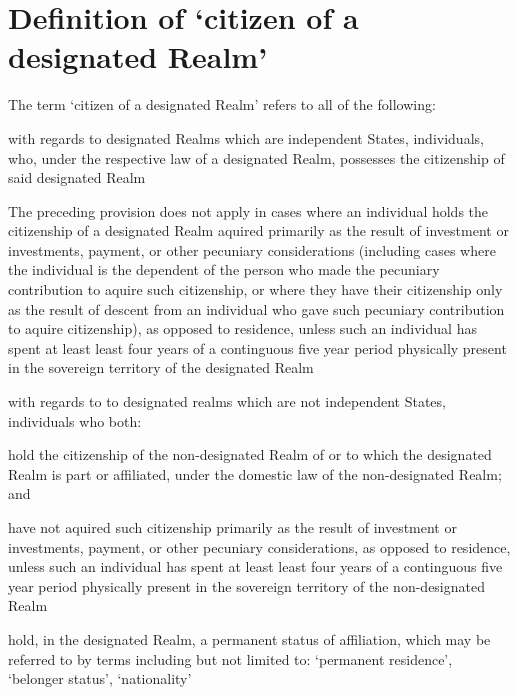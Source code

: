 \documentclass{ukbill}
\begin{document}
\section{Definition of `citizen of a designated Realm'}
\begin{numstat}
\item The term `citizen of a designated Realm' refers to all of the following:
\begin{alphstat}
	\item  with regards to designated Realms which are independent States, individuals, who, under the respective law of a designated Realm, possesses the citizenship of said designated Realm
	\begin{romstat}
		\item The preceding provision does not apply in cases where an individual holds the citizenship of a designated Realm aquired  primarily as the result of investment or investments, payment, or other pecuniary  considerations (including cases where the individual is the dependent of the person who made the pecuniary contribution  to aquire such citizenship, or where they have their citizenship only as the result of descent from an individual who gave such pecuniary contribution to aquire citizenship), as opposed to residence, unless such an individual has  spent at least least four years  of a continguous five year period  physically present in the sovereign territory of the designated Realm 
	\end{romstat}
	\item with regards to to designated realms which are not independent States, individuals who both:
\begin{romstat}
	\item hold the citizenship of the non-designated Realm of or to which the designated Realm is part  or affiliated, under the domestic law of the non-designated Realm; and
	\item have not aquired such citizenship primarily as the result of investment or investments, payment, or other pecuniary  considerations, as opposed to residence, unless such an individual has  spent at least least four years  of a continguous five year period  physically present in the sovereign territory of the non-designated Realm 
	\item hold, in the designated Realm, a permanent status of affiliation, which may be referred to by terms including but not limited to: `permanent residence', `belonger status', `nationality'
\end{romstat}
\end{alphstat}
	
\end{numstat}
\end{document}
